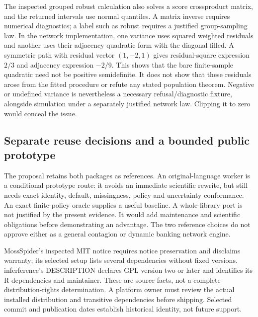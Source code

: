 The inspected grouped robust calculation also solves a score crossproduct
matrix, and the returned intervals use normal quantiles. A matrix inverse
requires numerical diagnostics; a label such as robust requires a justified
group-sampling law. In the network implementation, one variance uses squared
weighted residuals and another uses their adjacency quadratic form with the
diagonal filled. A symmetric path with residual vector $(1,-2,1)$ gives
residual-square expression $2/3$ and adjacency expression $-2/9$. This shows
that the bare finite-sample quadratic need not be positive semidefinite. It
does not show that these residuals arose from the fitted procedure or refute
any stated population theorem. Negative or undefined variance is nevertheless
a necessary refusal/diagnostic fixture, alongside simulation under a separately
justified network law. Clipping it to zero would conceal the issue.
\citep{exec24_interference_mossspider,exec24_interference_inferference,exec24_interference_reference}

\subsection{Separate reuse decisions and a bounded public prototype}
The proposal retains both packages as references. An original-language worker
is a conditional prototype route: it avoids an immediate scientific rewrite,
but still needs exact identity, default, missingness, policy and uncertainty
conformance. An exact finite-policy oracle supplies a useful baseline. A
whole-library port is not justified by the present evidence. It would add
maintenance and scientific obligations before demonstrating an advantage.
The two reference choices do not approve either as a general contagion or
dynamic banking network engine.
\citep{exec24_interference_reference}

MossSpider's inspected MIT notice requires notice preservation and disclaims
warranty; its selected setup lists several dependencies without fixed versions.
inferference's DESCRIPTION declares GPL version two or later and identifies its
R dependencies and maintainer. These are source facts, not a complete
distribution-rights determination. A platform owner must review the actual
installed distribution and transitive dependencies before shipping. Selected
commit and publication dates establish historical identity, not future support.
\citep{exec24_interference_mossspider,exec24_interference_inferference}

